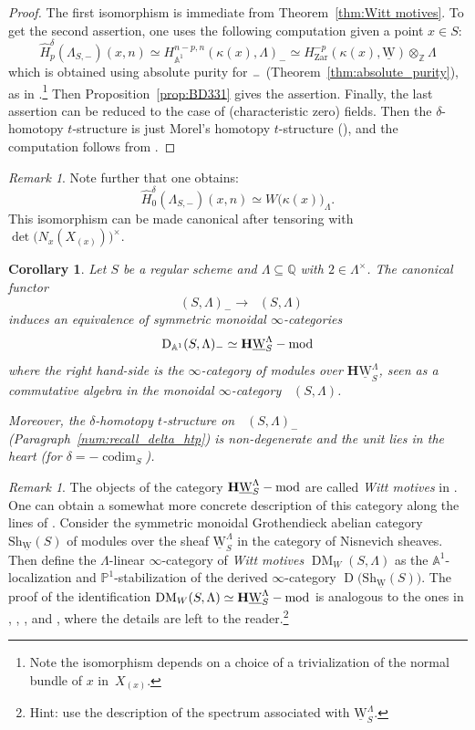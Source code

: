 \documentclass[11pt]{article}
\makeatletter
\numberwithin{equation}{section}\renewcommand{\encodingdefault}{TU}
\newcommand{\tstructure}{$t$-structure\xspace}
\DeclareRobustCommand{\mathbbm}[1]{\csname jepbb@#1\endcsname}
\newcommand{\modl}[1]{#1\textnormal{-}\mathrm{mod}}
\renewcommand{\AA}{\mathbb A}
\newcommand{\un}{\mathbbm 1}
\newcommand{\uW}{\underline{\mathrm W}}
\newcommand{\HuW}{\mathbf H \underline{\mathrm W}}
\DeclareMathOperator{\codim}{codim}
\DeclareMathOperator{\DM}{DM}
\DeclareMathOperator{\DA}{D_{\AA^1}}
\DeclareMathOperator{\Der}{D}
\newcommand{\ZZ} {\mathbb Z}
\newcommand{\QQ} {\mathbb Q}
\newcommand{\PP} {\mathbb P}
\newcommand{\zar}{\mathrm{Zar}}
\newtheorem{cor}[thm]{Corollary}
\theoremstyle{remark}
\newtheorem{rem}[thm]{Remark}
\theoremstyle{definition}
\numberwithin{equation}{thm}
\makeatother
\begin{document}
\begin{proof}
The first isomorphism is immediate from Theorem~\ref{thm:Witt motives}. To get the second assertion, one uses the following computation
given a point $x \in S$:
\[
\hat H_p^\delta(\Lambda_{S,-})(x,n) \simeq H^{n-p,n}_{\AA^1}(\kappa(x),\Lambda)_-
\simeq H^{-p}_\zar(\kappa(x),\uW) \otimes_\ZZ \Lambda
\]
which is obtained using absolute purity for $\un_-$ (Theorem~\ref{thm:absolute_purity}),
as in \cite[Ex.\,3.2.8]{BD1}.\footnote{Note the isomorphism depends on a choice
of a trivialization of the normal bundle of $x$ in~$X_{(x)}$.}
Then Proposition~\ref{prop:BD331} gives the assertion.
Finally, the last assertion can be reduced to the case of (characteristic zero)
fields. Then the $\delta$-homotopy \tstructure is just Morel's homotopy \tstructure
(\cite[Ex.\,2.3.5(2)]{BD1}), and the computation follows from \cite[Th.\,1, Rem.\,1]{ALP}.
\end{proof}

\begin{rem}
Note further that one obtains:
\[\hat H_0^\delta(\Lambda_{S,-})(x,n) \simeq W\big(\kappa(x)\big)_\Lambda.\]
This isomorphism
can be made canonical after tensoring with $\det\big(N_x(X_{(x)})\big)^\times$.
\end{rem}

\begin{cor}\label{cor:minus_DA&Witt_modl}
Let $S$ be a regular scheme and $\Lambda \subseteq \QQ$ with $2 \in \Lambda^\times$.
The canonical functor
\[
\DA(S,\Lambda)_- \to \DA(S,\Lambda)
\]
induces an equivalence of symmetric monoidal $\infty$-categories
\[
\DA(S,\Lambda)_- \simeq \modl{\HuW_S^\Lambda}
\]
where the right hand-side is the $\infty$-category of modules
over $\HuW_S^\Lambda$, seen as a commutative algebra in the
monoidal $\infty$-category $\DA(S,\Lambda)$.

Moreover, the $\delta$-homotopy \tstructure
on $\DA(S,\Lambda)_-$
(Paragraph~\ref{num:recall_delta_htp})
is non-degenerate and the unit lies in the heart
(for $\delta=-\codim_S$).
\end{cor}

\begin{rem}
The objects of the category $\modl{\HuW_S^\Lambda}$ are called \emph{Witt motives}
in \cite[\S 4]{ALP}. One can obtain a somewhat more concrete description
of this category along the lines of \cite{ALP}.
Consider the symmetric monoidal Grothendieck abelian category
$\mathrm{Sh}_{\uW}(S)$ of modules over the sheaf $\uW_S^\Lambda$ in the category of Nisnevich sheaves.
Then define the $\Lambda$-linear $\infty$-category of \emph{Witt motives}
$\DM_W(S,\Lambda)$ as the $\AA^1$\nobreakdash-localization and $\PP^1$-stabilization of the derived $\infty$-category $\Der\big(\mathrm{Sh}_{\uW}(S)\big)$.
The proof of the identification $\DM_W(S,\Lambda) \simeq \modl{\HuW_S^\Lambda}$ is analogous to the ones in \cite{RO}, \cite{CD5}, \cite{BachmannFasel}, \cite{EHKSY3} and \cite{ElmantoKolderup}, where the details are left to the reader.\footnote{Hint: use the description of the spectrum associated with $\uW_S^\Lambda$.}
\end{rem}
\end{document}
